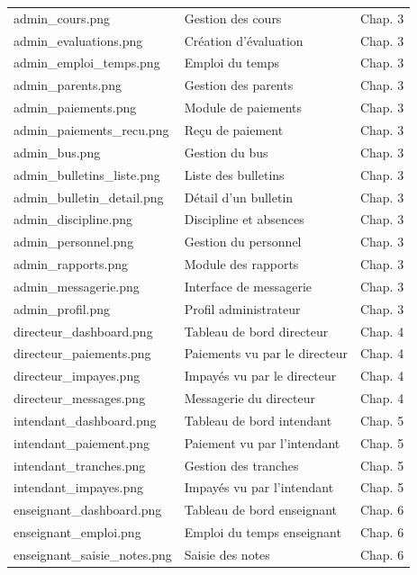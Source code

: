 \documentclass[12pt, a4paper, twoside, openright]{report}
\begin{document}
\begin{table}[htbp]
\begin{tabularx}{\textwidth}{>{\ttfamily\small}p{5.5cm} X l}
    admin\_cours.png & Gestion des cours & Chap. 3 \\
    admin\_evaluations.png & Création d'évaluation & Chap. 3 \\
    admin\_emploi\_temps.png & Emploi du temps & Chap. 3 \\
    admin\_parents.png & Gestion des parents & Chap. 3 \\
    admin\_paiements.png & Module de paiements & Chap. 3 \\
    admin\_paiements\_recu.png & Reçu de paiement & Chap. 3 \\
    admin\_bus.png & Gestion du bus & Chap. 3 \\
    admin\_bulletins\_liste.png & Liste des bulletins & Chap. 3 \\
    admin\_bulletin\_detail.png & Détail d'un bulletin & Chap. 3 \\
    admin\_discipline.png & Discipline et absences & Chap. 3 \\
    admin\_personnel.png & Gestion du personnel & Chap. 3 \\
    admin\_rapports.png & Module des rapports & Chap. 3 \\
    admin\_messagerie.png & Interface de messagerie & Chap. 3 \\
    admin\_profil.png & Profil administrateur & Chap. 3 \\
    directeur\_dashboard.png & Tableau de bord directeur & Chap. 4 \\
    directeur\_paiements.png & Paiements vu par le directeur & Chap. 4 \\
    directeur\_impayes.png & Impayés vu par le directeur & Chap. 4 \\
    directeur\_messages.png & Messagerie du directeur & Chap. 4 \\
    intendant\_dashboard.png & Tableau de bord intendant & Chap. 5 \\
    intendant\_paiement.png & Paiement vu par l'intendant & Chap. 5 \\
    intendant\_tranches.png & Gestion des tranches & Chap. 5 \\
    intendant\_impayes.png & Impayés vu par l'intendant & Chap. 5 \\
    enseignant\_dashboard.png & Tableau de bord enseignant & Chap. 6 \\
    enseignant\_emploi.png & Emploi du temps enseignant & Chap. 6 \\
    enseignant\_saisie\_notes.png & Saisie des notes & Chap. 6 \\

\end{tabularx}
\end{table}
\end{document}
